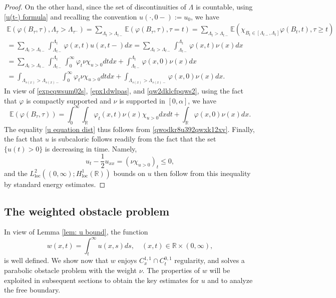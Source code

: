 \documentclass{article}
\numberwithin{equation}{section}
\numberwithin{figure}{section}
\theoremstyle{plain}
\theoremstyle{plain}
\theoremstyle{plain}
\theoremstyle{plain}
\theoremstyle{definition}
\theoremstyle{remark}
\def\R{{\mathbb{R}}}
\def\E{{\mathbb{E}}}
\begin{document}
\begin{proof}
On the other hand, since the set of discontinuities of $\Lambda$ is countable, using \eqref{u(t-) formula} and recalling the convention $u(\cdot,0-):=u_0$, we have
\begin{multline}  \label{qw2dklcfpqws2}   \E(\varphi(B_{\tau},\tau),\Lambda_{\tau}>\Lambda_{\tau^-})
=\sum_{\Lambda_{t}>\Lambda_{t-}}\E(\varphi(B_{\tau},\tau),\tau= t)
=\sum_{\Lambda_{t}>\Lambda_{t-}}\E(\chi_{B_t \in [\Lambda_{t-},\Lambda_t]}\varphi(B_{t},t),\tau\geq t)\\=\sum_{\Lambda_{t}>\Lambda_{t-}}\int_{\Lambda_{t-}}^{\Lambda_{t}}\varphi(x,t)u(x,t-)dx
=\sum_{\Lambda_{t}>\Lambda_{t-}}\int_{\Lambda_{t-}}^{\Lambda_{t}}\varphi(x,t)\nu(x)dx
\\=\sum_{\Lambda_{t}>\Lambda_{t-}}\int_{\Lambda_{t-}}^{\Lambda_{t}}\int_{0}^{\infty}\varphi_t\nu\chi_{u>0}dtdx+\int_{\Lambda_{t-}}^{\Lambda_t}\varphi(x,0)\nu(x)dx\\
=\int_{\Lambda_{s(x)}>\Lambda_{s(x)-}}\int_0^{\infty}\varphi_t\nu \chi_{u>0}dtdx+\int_{\Lambda_{s(x)}>\Lambda_{s(x)-}}\varphi(x,0)\nu(x)dx.
\end{multline}
In view of \eqref{expcqwsum02s}, \eqref{epx1dwlpas}, and \eqref{qw2dklcfpqws2}, using the fact that $\varphi$ is compactly supported and $\nu$ is supported in $[0,\alpha]$, we have
\begin{equation}
\E(\varphi(B_{\tau},\tau))=\int_{0}^{\infty}\int_{\R}\varphi_t(x,t)\nu(x)\chi_{u>0}dxdt+\int_{\R}\varphi(x,0)\nu(x)dx. 
\end{equation}
The equality \eqref{u equation dist} thus follows from \eqref{qwodkr8u392qwxk12xv}. Finally, the fact that $u$ is subcaloric follows readily from the fact that the set $\{u(t)>0\}$ is decreasing in time. Namely,
\[u_t-\frac12u_{xx}=(\nu\chi_{u>0})_t\leq0,\]
and the $L^2_{\operatorname{loc}}((0,\infty);H^1_{\operatorname{loc}}(\R))$ bounds on $u$ then follow from this inequality by standard energy estimates.
\end{proof}
\subsection{The weighted obstacle problem} 
In view of Lemma \ref{lem: u bound}, the function
\begin{equation} \label{w defi}
    w(x,t)=\int_{t}^{\infty}u(x,s)ds,\quad (x,t)\in \R \times (0,\infty),
\end{equation}
is well defined. We show now that $w$ enjoys $C^{1,1}_x \cap C^{0,1}_t$ regularity, and solves a parabolic obstacle problem with the weight $\nu$. The properties of $w$ will be exploited in subsequent sections to obtain the key estimates for $u$ and to analyze the free boundary.
\end{document}
